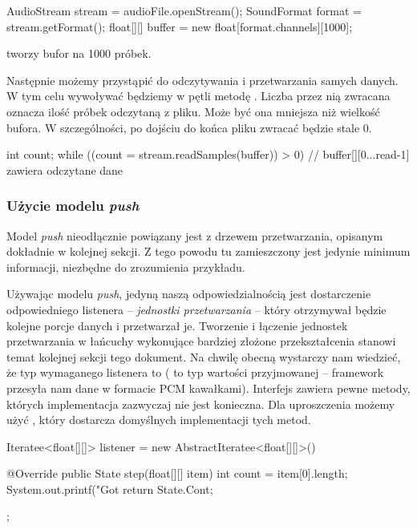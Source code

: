 \begin{java}
AudioStream stream = audioFile.openStream();
SoundFormat format = stream.getFormat();
float[][] buffer = new float[format.channels][1000];
\end{java}

tworzy bufor na 1000 próbek.

Następnie możemy przystąpić do odczytywania i przetwarzania samych danych. W tym celu wywoływać
będziemy w pętli metodę . Liczba przez nią zwracana oznacza ilość próbek odczytaną
z pliku. Może być ona mniejsza niż wielkość bufora. W szczególności, po dojściu do końca pliku
 zwracać będzie stale 0.

\begin{java}
int count;
while ((count = stream.readSamples(buffer)) > 0) {
    // buffer[][0...read-1] zawiera odczytane dane
}
\end{java}

\subsubsection{Użycie modelu \emph{push}}

\begin{Note}
Model \emph{push} nieodłącznie powiązany jest z drzewem przetwarzania, opisanym dokładnie w kolejnej
sekcji. Z tego powodu tu zamieszczony jest jedynie minimum informacji, niezbędne do zrozumienia
przykładu.
\end{Note}

Używając modelu \emph{push}, jedyną naszą odpowiedzialnością jest dostarczenie odpowiedniego
listenera -- \emph{jednostki przetwarzania} -- który otrzymywał będzie kolejne porcje danych i
przetwarzał je.  Tworzenie i łączenie jednostek przetwarzania w łańcuchy wykonujące bardziej złożone
przekształcenia stanowi temat kolejnej sekcji tego dokument. Na chwilę obecną wystarczy nam
wiedzieć, że typ wymaganego listenera to  ( to typ
wartości przyjmowanej -- framework przesyła nam dane w formacie PCM kawałkami). Interfejs
 zawiera pewne metody, których implementacja zazwyczaj nie jest konieczna. Dla
uproszczenia możemy użyć , który dostarcza domyślnych implementacji tych
metod.

\begin{java}
Iteratee<float[][]> listener = new AbstractIteratee<float[][]>() {

    @Override
    public State step(float[][] item) {
        int count = item[0].length;
        System.out.printf("Got %
        return State.Cont;
    }
};
\end{java}

